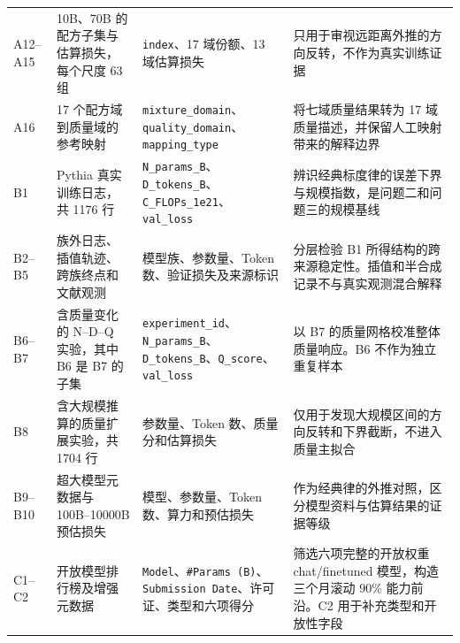 \documentclass[bwprint]{gmcmthesis}
\begin{document}
\begin{appendices}
\begin{longtable}{P{1.15cm} C{3.65cm} C{4.25cm} C{5.55cm}}
        A12--A15 & 10B、70B 的配方子集与估算损失，每个尺度 63 组                  & \texttt{index}、17 域份额、13 域估算损失                                                                           & 只用于审视远距离外推的方向反转，不作为真实训练证据                                       \\
        A16      & 17 个配方域到质量域的参考映射                              & \texttt{mixture\_domain}、\texttt{quality\_domain}、\texttt{mapping\_type}                                 & 将七域质量结果转为 17 域质量描述，并保留人工映射带来的解释边界                               \\
        B1       & Pythia 真实训练日志，共 1176 行                        & \texttt{N\_params\_B}、\texttt{D\_tokens\_B}、\texttt{C\_FLOPs\_1e21}、\texttt{val\_loss}                   & 辨识经典标度律的误差下界与规模指数，是问题二和问题三的规模基线                                 \\
        B2--B5   & 族外日志、插值轨迹、跨族终点和文献观测                           & 模型族、参数量、Token 数、验证损失及来源标识                                                                                & 分层检验 B1 所得结构的跨来源稳定性。插值和半合成记录不与真实观测混合解释                          \\
        B6--B7   & 含质量变化的 N--D--Q 实验，其中 B6 是 B7 的子集              & \texttt{experiment\_id}、\texttt{N\_params\_B}、\texttt{D\_tokens\_B}、\texttt{Q\_score}、\texttt{val\_loss} & 以 B7 的质量网格校准整体质量响应。B6 不作为独立重复样本                                 \\
        B8       & 含大规模推算的质量扩展实验，共 1704 行                        & 参数量、Token 数、质量分和估算损失                                                                                     & 仅用于发现大规模区间的方向反转和下界截断，不进入质量主拟合                                   \\
        B9--B10  & 超大模型元数据与 100B--10000B 预估损失                    & 模型、参数量、Token 数、算力和预估损失                                                                                   & 作为经典律的外推对照，区分模型资料与估算结果的证据等级                                     \\
        C1--C2   & 开放模型排行榜及增强元数据                                 & \texttt{Model}、\texttt{\#Params (B)}、\texttt{Submission Date}、许可证、类型和六项得分                                & 筛选六项完整的开放权重 chat/finetuned 模型，构造三个月滚动 90\% 能力前沿。C2 用于补充类型和开放性字段 \\

\end{longtable}
\end{appendices}
\end{document}
